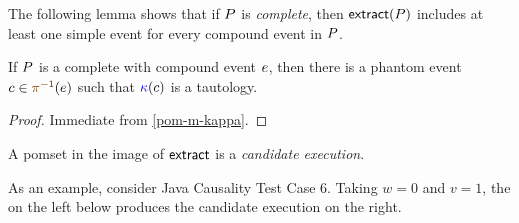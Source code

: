 The following lemma shows that if $P$ is \emph{complete}, then
$\fextract{\aPS}$ includes at least one simple event for every compound event
in $P$.

\begin{lemma}
  If $P$ is a complete \PwTpo{} with compound event $e$,
  then
  there is a phantom event $\cEv\in\fmrginv{\aEv}$
  such that
  ${\color{blue}\kappa}(c)$ is a tautology.
  \begin{proof}
    Immediate from \ref{pom-m-kappa}.
  \end{proof}
\end{lemma}

A pomset in the image of $\fextract{}$ is a \emph{candidate execution}.

As an example, consider Java Causality Test Case 6.  Taking $w=0$ and $v=1$,
the \PwTpo{} on the left below produces the candidate execution on the right.
